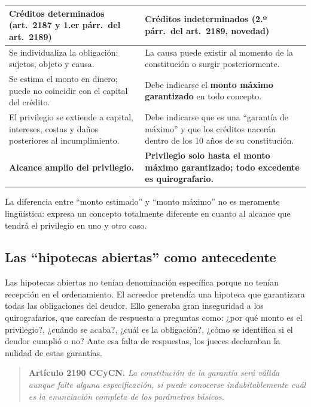 \documentclass[12pt,oneside]{book}
\begin{document}
\begin{table}[H]
\centering
\begin{tabularx}{\textwidth}{L L}
\toprule
\textbf{Créditos determinados (art.~2187 y 1.er párr.\ del art.~2189)} & \textbf{Créditos indeterminados (2.º párr.\ del art.~2189, novedad)} \\
\midrule
Se individualiza la obligación: sujetos, objeto y causa. &
La causa puede existir al momento de la constitución o surgir posteriormente. \\
\addlinespace
Se estima el monto en dinero; puede no coincidir con el capital del crédito. &
Debe indicarse el \textbf{monto máximo garantizado} en todo concepto. \\
\addlinespace
El privilegio se extiende a capital, intereses, costas y daños posteriores al incumplimiento. &
Debe indicarse que es una ``garantía de máximo'' y que los créditos nacerán dentro de los 10 años de su constitución. \\
\addlinespace
\textbf{Alcance amplio del privilegio.} &
\textbf{Privilegio solo hasta el monto máximo garantizado; todo excedente es quirografario.} \\
\bottomrule
\end{tabularx}
\end{table}

\begin{important}
La diferencia entre ``monto estimado'' y ``monto máximo'' no es meramente lingüística: expresa un concepto totalmente diferente en cuanto al alcance que tendrá el privilegio en uno y otro caso.
\end{important}

\subsection{Las ``hipotecas abiertas'' como antecedente}

Las hipotecas abiertas no tenían denominación específica porque no tenían recepción en el ordenamiento. El acreedor pretendía una hipoteca que garantizara todas las obligaciones del deudor. Ello generaba gran inseguridad a los quirografarios, que carecían de respuesta a preguntas como: ¿por qué monto es el privilegio?, ¿cuándo se acaba?, ¿cuál es la obligación?, ¿cómo se identifica si el deudor cumplió o no? Ante esa falta de respuestas, los jueces declaraban la nulidad de estas garantías.

\begin{quote}
\textbf{Artículo 2190 CCyCN.} \textit{La constitución de la garantía será válida aunque falte alguna especificación, si puede conocerse indubitablemente cuál es la enunciación completa de los parámetros básicos.}
\end{quote}
\end{document}
